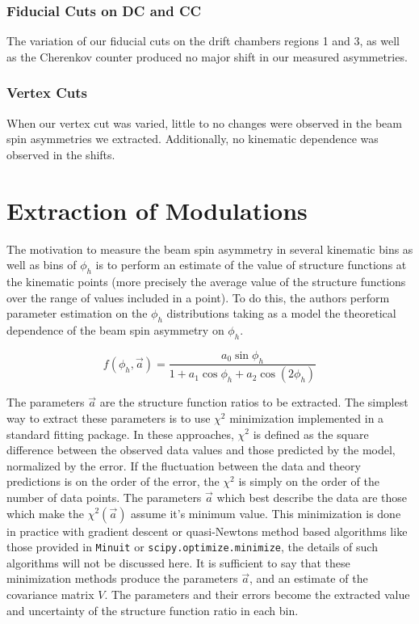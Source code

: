 \subsubsection*{Fiducial Cuts on DC and CC}
The variation of our fiducial cuts on the drift chambers regions 1 and 3, as well as the Cherenkov counter produced no major shift in our measured asymmetries.  

\subsubsection*{Vertex Cuts}
When our vertex cut was varied, little to no changes were observed in the beam spin asymmetries we extracted.  Additionally, no kinematic dependence was observed in the shifts.

\section{Extraction of Modulations}
The motivation to measure the beam spin asymmetry in several kinematic bins as well as bins of $\phi_{h}$ is to perform an estimate of the value of structure functions at the kinematic points (more precisely the average value of the structure functions over the range of values included in a point).  To do this, the authors perform parameter estimation on the $\phi_{h}$ distributions taking as a model the theoretical dependence of the beam spin asymmetry on $\phi_{h}$.

\begin{equation}
  f(\phi_h, \vec{a}) = \frac{a_0 \sin\phi_h}{1 + a_1 \cos\phi_h + a_2 \cos(2\phi_h)}
\end{equation}

The parameters $\vec{a}$ are the structure function ratios to be extracted.  The simplest way to extract these parameters is to use $\chi^2$ minimization implemented in a standard fitting package.  In these approaches, $\chi^2$ is defined as the square difference between the observed data values and those predicted by the model, normalized by the error.  If the fluctuation between the data and theory predictions is on the order of the error, the $\chi^2$ is simply on the order of the number of data points.  The parameters $\vec{a}$ which best describe the data are those which make the $\chi^2 (\vec{a})$ assume it's minimum value.  This minimization is done in practice with gradient descent or quasi-Newtons method based algorithms like those provided in \texttt{Minuit} or \texttt{scipy.optimize.minimize}, the details of such algorithms will not be discussed here.  It is sufficient to say that these minimization methods produce the parameters $\vec{a}$, and an estimate of the covariance matrix $V$.  The parameters and their errors become the extracted value and uncertainty of the structure function ratio in each bin. \\

